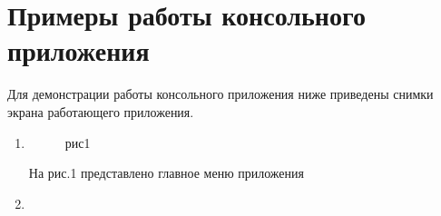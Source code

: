 \documentclass[12pt,a4paper]{report}
\begin{document}
\section{Примеры работы консольного приложения}
Для демонстрации работы консольного приложения ниже приведены снимки экрана работающего приложения.
\begin{enumerate}
\item
\begin{figure}[h!]
\caption{рис1}
\label{fig:image}
\end{figure}
На рис.1 представлено главное меню приложения
\item
\begin{figure}[h!]

\end{figure}
\end{enumerate}
\end{document}
